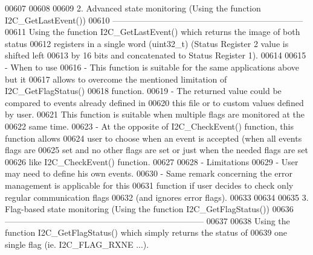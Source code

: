 \begin{DoxyCode}
00607 \textcolor{comment}{             }
00608 \textcolor{comment}{ }
00609 \textcolor{comment}{     2. Advanced state monitoring (Using the function I2C\_GetLastEvent())}
00610 \textcolor{comment}{     -------------------------------------------------------------------- }
00611 \textcolor{comment}{        Using the function I2C\_GetLastEvent() which returns the image of both status }
00612 \textcolor{comment}{        registers in a single word (uint32\_t) (Status Register 2 value is shifted left }
00613 \textcolor{comment}{        by 16 bits and concatenated to Status Register 1).}
00614 \textcolor{comment}{}
00615 \textcolor{comment}{          - When to use}
00616 \textcolor{comment}{             - This function is suitable for the same applications above but it }
00617 \textcolor{comment}{               allows to overcome the mentioned limitation of I2C\_GetFlagStatus() }
00618 \textcolor{comment}{               function.}
00619 \textcolor{comment}{             - The returned value could be compared to events already defined in }
00620 \textcolor{comment}{               this file or to custom values defined by user.}
00621 \textcolor{comment}{               This function is suitable when multiple flags are monitored at the }
00622 \textcolor{comment}{               same time.}
00623 \textcolor{comment}{             - At the opposite of I2C\_CheckEvent() function, this function allows }
00624 \textcolor{comment}{               user to choose when an event is accepted (when all events flags are }
00625 \textcolor{comment}{               set and no other flags are set or just when the needed flags are set }
00626 \textcolor{comment}{               like I2C\_CheckEvent() function.}
00627 \textcolor{comment}{}
00628 \textcolor{comment}{          - Limitations}
00629 \textcolor{comment}{             - User may need to define his own events.}
00630 \textcolor{comment}{             - Same remark concerning the error management is applicable for this }
00631 \textcolor{comment}{               function if user decides to check only regular communication flags }
00632 \textcolor{comment}{               (and ignores error flags).}
00633 \textcolor{comment}{      }
00634 \textcolor{comment}{ }
00635 \textcolor{comment}{     3. Flag-based state monitoring (Using the function I2C\_GetFlagStatus())}
00636 \textcolor{comment}{     -----------------------------------------------------------------------}
00637 \textcolor{comment}{     }
00638 \textcolor{comment}{      Using the function I2C\_GetFlagStatus() which simply returns the status of }
00639 \textcolor{comment}{      one single flag (ie. I2C\_FLAG\_RXNE ...). }

\end{DoxyCode}

